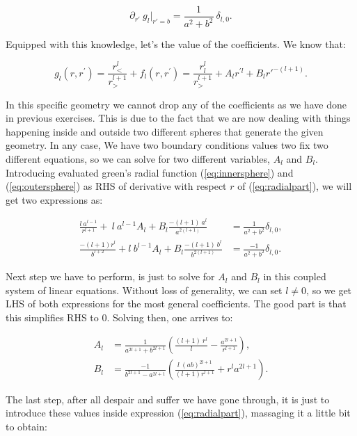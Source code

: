 \begin{equation}\label{eq:outersphere}
	\partial_{r'} \:g_{l}\biggr\rvert_{r'=b} = \frac{1}{a^{2} + b^{2}} \:\delta_{l,0}.
\end{equation}

Equipped with this knowledge, let's the value of the coefficients. We know that:

\begin{equation}\label{eq:radialpart}
	g_{l}\left(r, r^{\prime}\right)=\frac{r_{<}^{l}}{r_{>}^{l+1}}+f_{l}\left(r, r^{\prime}\right) = \frac{r_{l}^{l}}{r_{>}^{l+1}} + A_{l} r^{\prime l} + B_{l} r'^{ -(l+1)}.  
\end{equation}

In this specific geometry we cannot drop any of the coefficients as we have done in previous exercises. This is due to the fact that we are now dealing with things happening inside and outside two different spheres that generate the given geometry. In any case, We have two boundary conditions values two fix two different equations, so we can solve for two different variables, $A_{l}$ and $B_{l}$.  Introducing evaluated green's radial function (\ref{eq:innersphere}) and (\ref{eq:outersphere}) as RHS of derivative with respect $r$ of (\ref{eq:radialpart}), we will get two expressions as:

\begin{align}
	\frac{l\: a^{l-1}}{r^{l+1}}+\:l\: a^{l-1} A_{l} + B_{l} \frac{-(l+1)\: a^{l}}{a^{2(l+1)}} &=\frac{1}{a^{2}+ b^{2}} \delta_{l,0},\\
	\frac{-(l+1)r^{l}}{b^{l+2}}+ l\: b^{l-1} A_{l} + B_{l} \frac{-(l+1)\: b^{l}}{b^{2(l+1)}} &=\frac{-1}{a^{2}+ b^{2}} \delta_{l,0}.
\end{align}

Next step we have to perform, is just to solve for $A_{l}$ and $B_{l}$ in this coupled system of linear equations. Without loss of generality, we can set $l \neq 0$, so we get LHS of both expressions for the most general coefficients. The good part is that this simplifies RHS to 0. Solving then, one arrives to:
	
\begin{align}
	A_{l} &= \frac{1}{a^{2l+1} + b^{2l+1}} \left(\frac{(l+1)\: r^{l}}{l} - \frac{a^{2l+1}}{r^{l+1}}\right),\\
	B_{l} &= \frac{-1}{b^{2l+1} - a^{2l+1}} \left(\frac{l\: (ab)^{2l+1}}{(l+1) r^{l+1}} + r^{l} a^{2l+1}\right).
\end{align}

The last step, after all despair and suffer we have gone through, it is just to introduce these values inside expression (\ref{eq:radialpart}), massaging it a little bit to obtain:
	
